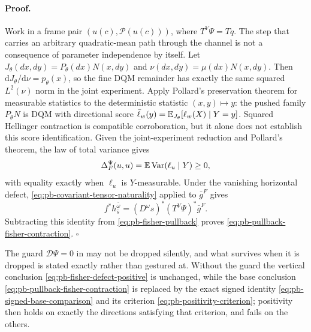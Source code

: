 \paragraph{Proof.}
Work in a frame pair $(u(c),\mathcal P(u(c)))$, where $T^V\Psi=Tq$.  The step
that carries an arbitrary quadratic-mean path through the channel is not a
consequence of parameter independence by itself.  Let
$J_\theta(dx,dy)=P_\theta(dx)N(x,dy)$ and
$\nu(dx,dy)=\mu(dx)N(x,dy)$.  Then
$\mathrm dJ_\theta/\mathrm d\nu=p_\theta(x)$, so the fine DQM remainder has
exactly the same squared $L^2(\nu)$ norm in the joint experiment. Apply
Pollard's preservation theorem for measurable statistics \citep{Pollard2013}
to the deterministic statistic
$(x,y)\mapsto y$: the
pushed family $P_\theta N$ is DQM with directional score
$\bar\ell_w(y)=\mathbb E_{J_\theta}[\ell_w(X)\mid Y=y]$.  Squared
Hellinger contraction is compatible corroboration, but it alone does not
establish this score identification.  Given the joint-experiment reduction
and Pollard's theorem, the law of total variance gives
\begin{equation}
\Delta_F^\Psi(u,u)
=\mathbb E\operatorname{Var}(\ell_u\mid Y)\geq0,
\label{eq:pb-fisher-defect-score-variance}
\end{equation}
with equality exactly when $\ell_u$ is $Y$-measurable.  Under the
vanishing horizontal defect,
\eqref{eq:pb-covariant-tensor-naturality} applied to $\bar g^F$ gives
\[
f^*h_{\bar s}^{\bar\omega}
=(D^\omega s)^*(T^V\Psi)^*\bar g^F.
\]
Subtracting this identity from \eqref{eq:pb-fisher-pullback} proves
\eqref{eq:pb-pullback-fisher-contraction}.  $\square$

The guard $\mathcal D\Psi=0$ in  may not be
dropped silently, and what survives when it is dropped is stated exactly rather
than gestured at.  Without the guard the vertical conclusion
\eqref{eq:pb-fisher-defect-positive} is unchanged, while the base conclusion
\eqref{eq:pb-pullback-fisher-contraction} is replaced by the exact signed
identity \eqref{eq:pb-signed-base-comparison} and its criterion
\eqref{eq:pb-positivity-criterion}; positivity then holds on exactly the
directions satisfying that criterion, and fails on the others.

